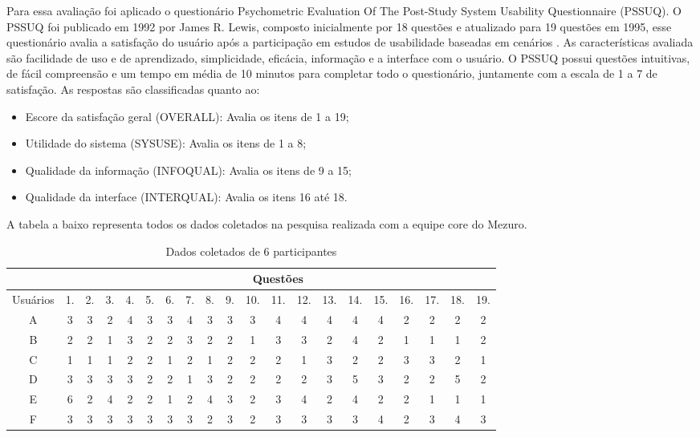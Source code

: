Para essa avaliação foi aplicado o questionário Psychometric Evaluation Of The Post-Study System Usability Questionnaire (PSSUQ). O PSSUQ foi publicado em 1992 por James R. Lewis, composto inicialmente por 18 questões e atualizado para 19 questões em 1995, esse questionário avalia a satisfação do usuário após a participação em estudos de usabilidade baseadas em cenários \cite{lewis1992}. As características avaliada são facilidade de uso e de aprendizado, simplicidade, eficácia, informação e a interface com o usuário. O PSSUQ possui questões intuitivas, de fácil compreensão e um tempo em média de 10 minutos para completar todo o questionário, juntamente com a escala de 1 a 7 de satisfação. As respostas são classificadas quanto ao:
\begin{itemize}
\item Escore da satisfação geral (OVERALL): Avalia os itens de 1 a 19;
\item Utilidade do sistema (SYSUSE): Avalia os itens de 1 a 8;
\item Qualidade da informação (INFOQUAL): Avalia os itens de 9 a 15;
\item Qualidade da interface (INTERQUAL): Avalia os itens 16 até 18.
\end{itemize}

A tabela a baixo representa todos os dados coletados na pesquisa realizada com a equipe core do Mezuro.

\begin{table}[H]
\begin{tabular}{|c|c|c|c|c|c|c|c|c|c|c|c|c|c|c|c|c|c|c|c|}
\hline
\multicolumn{1}{|l|}{} & \multicolumn{19}{c|}{Questões}                                                                         \\ \hline
Usuários& 1. & 2. & 3. & 4. & 5. & 6. & 7. & 8. & 9. & 10. & 11. & 12. & 13. & 14. & 15. & 16. & 17. & 18. & 19. \\ \hline
A                      & 3  & 3  & 2  & 4  & 3  & 3  & 4  & 3  & 3  & 3   & 4   & 4   & 4   & 4   & 4   & 2   & 2   & 2   & 2   \\ \hline
B                      & 2  & 2  & 1  & 3  & 2  & 2  & 3  & 2  & 2  & 1   & 3   & 3   & 2   & 4   & 2   & 1   & 1   & 1   & 2   \\ \hline
C                      & 1  & 1  & 1  & 2  & 2  & 1  & 2  & 1  & 2  & 2   & 2   & 1   & 3   & 2   & 2   & 3   & 3   & 2   & 1   \\ \hline
D                      & 3  & 3  & 3  & 3  & 2  & 2  & 1  & 3  & 2  & 2   & 2   & 2   & 3   & 5   & 3   & 2   & 2   & 5   & 2   \\ \hline
E                      & 6  & 2  & 4  & 2  & 2  & 1  & 2  & 4  & 3  & 2   & 3   & 4   & 2   & 4   & 2   & 2   & 1   & 1   & 1   \\ \hline
F                      & 3  & 3  & 3  & 3  & 3  & 3  & 3  & 2  & 3  & 2   & 3   & 3   & 3   & 3   & 4   & 2   & 3   & 4   & 3   \\ \hline
\end{tabular}
\caption{Dados coletados de 6 participantes}
\end{table}

